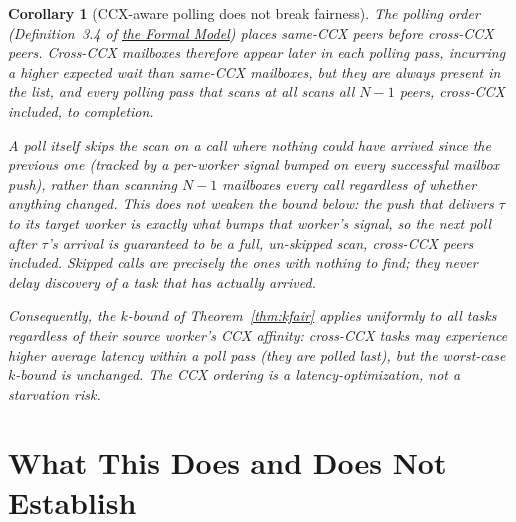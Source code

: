 \documentclass[11pt,a4paper]{report}
\newtheorem{corollary}[theorem]{Corollary}
\begin{document}
\begin{corollary}[CCX-aware polling does not break fairness]
\label{cor:ccx}
The polling order (Definition~3.4 of
\hyperref[chap:formal_model]{the Formal Model}) places same-CCX peers before
cross-CCX peers.  Cross-CCX mailboxes therefore appear later
in each polling pass, incurring a higher \emph{expected} wait
than same-CCX mailboxes, but they are \emph{always present} in
the list, and every polling pass that scans at all scans all $N-1$
peers, cross-CCX included, to completion.

A poll itself skips the scan on a call where nothing
could have arrived since the previous one (tracked by a per-worker
signal bumped on every successful mailbox push), rather than scanning
$N-1$ mailboxes every call regardless of whether anything changed.
This does not weaken the bound below: the push that delivers $\tau$ to
its target worker is exactly what bumps that worker's signal, so the
\emph{next} poll after $\tau$'s arrival is
guaranteed to be a full, un-skipped scan, cross-CCX peers included.
Skipped calls are precisely the ones with nothing to find; they never
delay discovery of a task that has actually arrived.

Consequently, the $k$-bound of Theorem~\ref{thm:kfair} applies
uniformly to all tasks regardless of their source worker's CCX
affinity: cross-CCX tasks may experience higher \emph{average}
latency within a poll pass (they are polled last), but the
worst-case $k$-bound is unchanged.  The CCX ordering is a
\emph{latency-optimization}, not a \emph{starvation risk}.
\end{corollary}

\section{What This Does and Does Not Establish}
\end{document}
